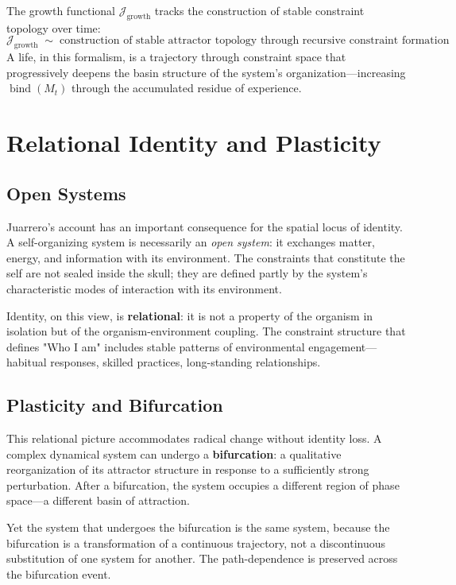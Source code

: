 \documentclass[11pt]{article}
\newcommand{\bind}{\operatorname{bind}}
\newcommand{\Jgrowth}{\mathcal{J}_{\mathrm{growth}}}
\begin{document}
The growth functional $\Jgrowth$ tracks the construction of stable constraint topology
over time:
\[
\Jgrowth \;\sim\; \text{construction of stable attractor topology through recursive constraint formation}
\]
A life, in this formalism, is a trajectory through constraint space that progressively
deepens the basin structure of the system's organization---increasing $\bind(M_t)$ through
the accumulated residue of experience.

\section{Relational Identity and Plasticity}

\subsection{Open Systems}

Juarrero's account has an important consequence for the spatial locus of identity. A
self-organizing system is necessarily an \emph{open system}: it exchanges matter, energy,
and information with its environment. The constraints that constitute the self are not
sealed inside the skull; they are defined partly by the system's characteristic modes of
interaction with its environment.

Identity, on this view, is \textbf{relational}: it is not a property of the organism in
isolation but of the organism-environment coupling. The constraint structure that defines
"Who I am" includes stable patterns of environmental engagement---habitual responses,
skilled practices, long-standing relationships.

\subsection{Plasticity and Bifurcation}

This relational picture accommodates radical change without identity loss. A complex
dynamical system can undergo a \textbf{bifurcation}: a qualitative reorganization of its
attractor structure in response to a sufficiently strong perturbation. After a bifurcation,
the system occupies a different region of phase space---a different basin of attraction.

Yet the system that undergoes the bifurcation is the same system, because the bifurcation
is a transformation of a continuous trajectory, not a discontinuous substitution of one
system for another. The path-dependence is preserved across the bifurcation event.
\end{document}
